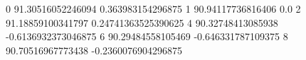 0 91.30516052246094 0.363983154296875
1 90.94117736816406 0.0
2 91.18859100341797 0.24741363525390625
4 90.32748413085938 -0.6136932373046875
6 90.29484558105469 -0.646331787109375
8 90.70516967773438 -0.2360076904296875

